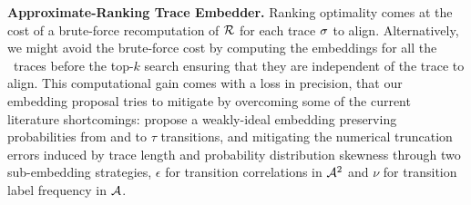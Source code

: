 \noindent
\textbf{Approximate-Ranking Trace Embedder.}\label{subsec:ate}
Ranking optimality comes at the cost of a brute-force recomputation of $\mathcal{R}$ for each trace $\sigma$ to align. Alternatively, we might avoid the brute-force cost by
computing the embeddings for all the \unravelled\ traces
before the top-$k$ search ensuring that they are independent of the trace to align. %
This computational gain comes with a loss in precision, that our embedding proposal tries to mitigate by overcoming some of the current literature shortcomings:
	 propose a weakly-ideal embedding
 preserving probabilities from and to $\tau$ transitions, and
 mitigating the numerical truncation errors induced by trace length and probability distribution skewness through two
sub-embedding strategies, $\epsilon$ for transition correlations in $\mathcal{A}^2$ and $\nu$ for transition label frequency in $\mathcal{A}$\cite{Bergami21}.
%

